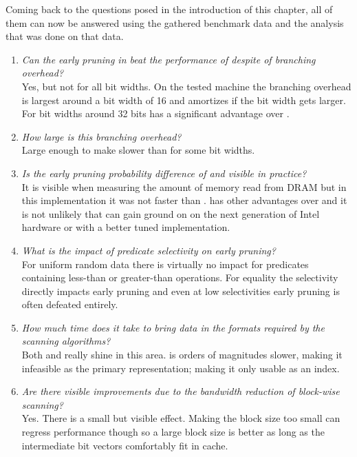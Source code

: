Coming back to the questions posed in the introduction of this chapter, all of
them can now be answered using the gathered benchmark data and the analysis that
was done on that data.

\begin{enumerate}
  \item \emph{Can the early pruning in \bwv{} beat the performance of
    \simdscan{} despite of branching overhead?}\\
    Yes, but not for all bit widths.  On the tested machine the branching
    overhead is largest around a bit width of 16 and amortizes if the bit width
    gets larger. For bit widths around 32 bits \bwv{} has a significant advantage
    over \simdscan{}.
  \item \emph{How large is this branching overhead?}\\
    Large enough to make \bwv{} slower than \simdscan{} for some bit widths.
  \item \emph{Is the early pruning probability difference of \bwv{} and \bs{}
    visible in practice?}\\
    It is visible when measuring the amount of memory read from DRAM but in this
    implementation it was not faster than \bwv{}. \bs{} has other advantages
    over \bwv{} and it is not unlikely that \bs{} can gain ground on \bwv{} on
    the next generation of Intel hardware or with a better tuned implementation.
  \item \emph{What is the impact of predicate selectivity on early pruning?}\\
    For uniform random data there is virtually no impact for predicates
    containing less-than or greater-than operations. For equality the
    selectivity directly impacts early pruning and even at low selectivities
    early pruning is often defeated entirely.
  \item \emph{How much time does it take to bring data in the formats required
    by the scanning algorithms?}\\
    Both \simdscan{} and \bs{} really shine in this area. \bwv{} is orders of
    magnitudes slower, making it infeasible as the primary representation;
    making it only usable as an index.
  \item \emph{Are there visible improvements due to the bandwidth reduction of
    block-wise scanning?}\\
    Yes. There is a small but visible effect. Making the block size too small
    can regress performance though so a large block size is better as long as
    the intermediate bit vectors comfortably fit in cache.
\end{enumerate}
